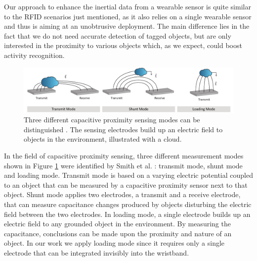 \documentclass[runningheads,a4paper]{llncs}
\begin{document}
Our approach to enhance the inertial data from a wearable sensor is quite similar to the RFID scenarios just mentioned, as it also relies on a single wearable sensor and thus is aiming at an unobtrusive deployment. The main difference lies in the fact that we do not need accurate detection of tagged objects, but are only interested in the proximity to various objects which, as we expect, could boost activity recognition.




\begin{figure}[htbp]
	\centering
		\includegraphics[width=1.00\textwidth]{Images/modes.pdf}
	\caption{Three different capacitive proximity sensing modes can be distinguished \cite{Smith1996}. The sensing electrodes build up an electric field to objects in the environment, illustrated with a cloud.}
	\label{fig:modes}
\end{figure}


In the field of capacitive proximity sensing, three different measurement modes shown in Figure \ref{fig:modes} were identified by Smith et al. \cite{Smith1999}: transmit mode, shunt mode and loading mode. Transmit mode is based on a varying electric potential coupled to an object that can be measured by a capacitive proximity sensor next to that object. Shunt mode applies two electrodes, a transmit and a receive electrode, that can measure capacitance changes produced by objects disturbing the electric field between the two electrodes. In loading mode, a single electrode builds up an electric field to any grounded object in the environment. By measuring the capacitance, conclusions can be made upon the proximity and nature of an object. In our work we apply loading mode since it requires only a single electrode that can be integrated invisibly into the wristband.
\end{document}
